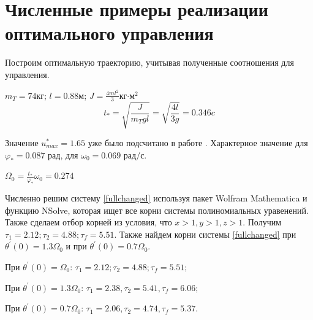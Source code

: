 \documentclass[a4paper,14pt]{article}
\theoremstyle{plain} %
\theoremstyle{definition} %
\theoremstyle{remark} %
\begin{document}
{\newpage
\section{Численные примеры реализации оптимального управления}
Построим оптимальную траекторию, учитывая полученные соотношения для управления.

$m_T=74$кг; $l=0.88$м; $J=\frac{4ml^2}{3}$кг$\cdot$м$^2$
\[
    t_\ast=\sqrt{\frac{J}{m_Tgl}}=\sqrt{\frac{4l}{3g}}=0.346c
\]

Значение $u^*_{max}=1.65$ уже было подсчитано в работе \cite{kurscah}.
Характерное значение для $\varphi_\ast=0.087 \text{ рад}$, для $\omega_0=0.069 \text{ рад/с}$.

$\Omega_0=\frac{t_\ast}{\varphi_\ast}\omega_0=0.274$

Численно решим систему \eqref{fullchanged} используя пакет Wolfram Mathematica и
функцию NSolve, которая ищет все корни системы полиномиальных уравенений. Также сделаем отбор корней из условия, что $x>1,y>1,z>1$. Получим $\tau_1=2.12;\tau_2=4.88;\tau_f=5.51.$
Также найдем корни системы \eqref{fullchanged} при $\theta^{'}(0)=1.3\Omega_0$ и при $\theta^{'}(0)=0.7\Omega_0$.

При $\theta^{'}(0)=\Omega_0$: $\tau_1=2.12;\tau_2=4.88;\tau_f=5.51;$

При $\theta^{'}(0)=1.3\Omega_0$: $\tau_1=2.38,\tau_2=5.41,\tau_f=6.06;$

При $\theta^{'}(0)=0.7\Omega_0$: $\tau_1=2.06,\tau_2=4.74,\tau_f=5.37.$

}
\end{document}
